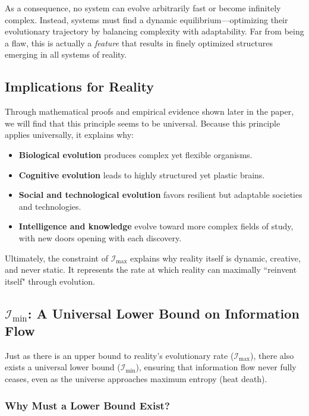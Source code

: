 \documentclass[12pt]{article}
\begin{document}
As a consequence, no system can evolve arbitrarily fast or become infinitely complex. Instead, systems must find a dynamic equilibrium—optimizing their evolutionary trajectory by balancing complexity with adaptability. Far from being a flaw, this is actually a \textit{feature} that results in finely optimized structures emerging in all systems of reality.

\subsection{Implications for Reality}

Through mathematical proofs and empirical evidence shown later in the paper, we will find that this principle seems to be universal. Because this principle applies universally, it explains why:

\begin{itemize}
    \item \textbf{Biological evolution} produces complex yet flexible organisms.
    \item \textbf{Cognitive evolution} leads to highly structured yet plastic brains.
    \item \textbf{Social and technological evolution} favors resilient but adaptable societies and technologies.
    \item \textbf{Intelligence and knowledge} evolve toward more complex fields of study, with new doors opening with each discovery.
\end{itemize}

Ultimately, the constraint of \(\mathcal{I}_{\text{max}}\) explains why reality itself is dynamic, creative, and never static. It represents the rate at which reality can maximally ``reinvent itself" through evolution.

\subsection{\( \mathcal{I}_{\text{min}} \): A Universal Lower Bound on Information Flow}

Just as there is an upper bound to reality's evolutionary rate (\( \mathcal{I}_{\text{max}} \)), there also exists a universal lower bound (\( \mathcal{I}_{\text{min}} \)), ensuring that information flow never fully ceases, even as the universe approaches maximum entropy (heat death).

\subsubsection{Why Must a Lower Bound Exist?}
\end{document}
